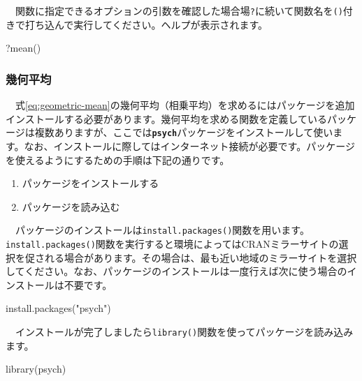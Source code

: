 \documentclass[
  12pt,
]{book}
\newenvironment{Shaded}{\begin{snugshade}}{\end{snugshade}}
\newcommand{\FunctionTok}[1]{\textcolor[rgb]{0.00,0.00,0.00}{#1}}
\newcommand{\NormalTok}[1]{#1}
\newcommand{\StringTok}[1]{\textcolor[rgb]{0.31,0.60,0.02}{#1}}
\providecommand{\tightlist}{%
  \setlength{\itemsep}{0pt}\setlength{\parskip}{0pt}}
\begin{document}
　関数に指定できるオプションの引数を確認した場合場\texttt{?}に続いて関数名を\texttt{()}付きで打ち込んで実行してください。ヘルプが表示されます。

\begin{Shaded}
\begin{Highlighting}[numbers=left,,]
\NormalTok{?}\FunctionTok{mean}\NormalTok{()}
\end{Highlighting}
\end{Shaded}

\hypertarget{ux5e7eux4f55ux5e73ux5747}{%
\subsubsection*{\texorpdfstring{幾何平均}{幾何平均}}\label{ux5e7eux4f55ux5e73ux5747}}

　式\eqref{eq:geometric-mean}の幾何平均（相乗平均）を求めるにはパッケージを追加インストールする必要があります。幾何平均を求める関数を定義しているパッケージは複数ありますが、ここでは\textbf{\texttt{psych}}パッケージをインストールして使います。なお、インストールに際してはインターネット接続が必要です。パッケージを使えるようにするための手順は下記の通りです。

\begin{enumerate}
\def\labelenumi{\arabic{enumi}.}
\tightlist
\item
  パッケージをインストールする
\item
  パッケージを読み込む
\end{enumerate}

　パッケージのインストールは\texttt{install.packages()}関数を用います。\texttt{install.packages()}関数を実行すると環境によってはCRANミラーサイトの選択を促される場合があります。その場合は、最も近い地域のミラーサイトを選択してください。なお、パッケージのインストールは一度行えば次に使う場合のインストールは不要です。

\begin{Shaded}
\begin{Highlighting}[numbers=left,,]
\FunctionTok{install.packages}\NormalTok{(}\StringTok{"psych"}\NormalTok{)}
\end{Highlighting}
\end{Shaded}

　インストールが完了しましたら\texttt{library()}関数を使ってパッケージを読み込みます。

\begin{Shaded}
\begin{Highlighting}[numbers=left,,]
\FunctionTok{library}\NormalTok{(psych)}
\end{Highlighting}
\end{Shaded}
\end{document}
